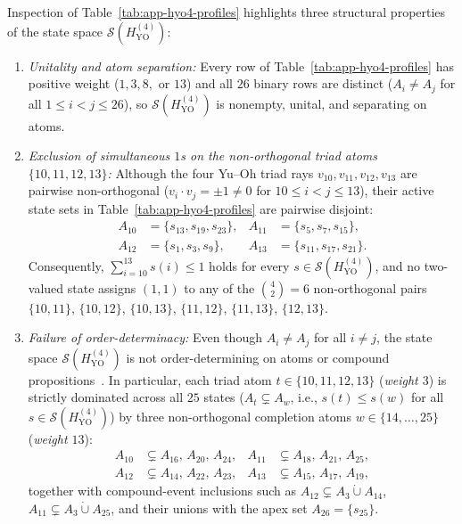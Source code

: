 \documentclass[
  aps,
  pra,
  reprint,
  superscriptaddress,
  amsmath,
  amssymb,
  nofootinbib,
  floatfix
]{revtex4-2}
\theoremstyle{definition}
\theoremstyle{remark}
\newcommand{\YO}{\mathrm{YO}}
\begin{document}
Inspection of Table~\ref{tab:app-hyo4-profiles} highlights three structural properties of the state space $\mathcal{S}(H_{\YO}^{(4)})$:
\begin{enumerate}
\item \emph{Unitality and atom separation:} Every row of Table~\ref{tab:app-hyo4-profiles} has positive weight ($1,3,8,$ or $13$) and all $26$ binary rows are distinct ($A_i\ne A_j$ for all $1\le i<j\le 26$), so $\mathcal{S}(H_{\YO}^{(4)})$ is nonempty, unital, and separating on atoms.
\item \emph{Exclusion of simultaneous $1$s on the non-orthogonal triad atoms $\{10,11,12,13\}$:} Although the four Yu--Oh triad rays $v_{10},v_{11},v_{12},v_{13}$ are pairwise non-orthogonal ($v_i\cdot v_j=\pm1\ne0$ for $10\le i<j\le 13$), their active state sets in Table~\ref{tab:app-hyo4-profiles} are pairwise disjoint:
\begin{equation}\label{eq:hyo4-triad-disjoint}
\begin{aligned}
A_{10}&=\{s_{13},s_{19},s_{23}\},&
A_{11}&=\{s_{5},s_{7},s_{15}\},\\
A_{12}&=\{s_{1},s_{3},s_{9}\},&
A_{13}&=\{s_{11},s_{17},s_{21}\}.
\end{aligned}
\end{equation}
Consequently, $\sum_{i=10}^{13}s(i)\le1$ holds for every $s\in\mathcal{S}(H_{\YO}^{(4)})$, and no two-valued state assigns $(1,1)$ to any of the $\binom{4}{2}=6$ non-orthogonal pairs $\{10,11\}$, $\{10,12\}$, $\{10,13\}$, $\{11,12\}$, $\{11,13\}$, $\{12,13\}$.
\item \emph{Failure of order-determinacy:} Even though $A_i\ne A_j$ for all $i\ne j$, the state space $\mathcal{S}(H_{\YO}^{(4)})$ is not order-determining on atoms or compound propositions~\cite{svozil-tkadlec}. In particular, each triad atom $t\in\{10,11,12,13\}$ (\emph{weight $3$}) is strictly dominated across all $25$ states ($A_t\subsetneq A_w$, i.e., $s(t)\le s(w)$ for all $s\in\mathcal{S}(H_{\YO}^{(4)})$) by three non-orthogonal completion atoms $w\in\{14,\ldots,25\}$ (\emph{weight $13$}):
\begin{equation}\label{eq:hyo4-inclusions}
\begin{aligned}
A_{10}&\subsetneq A_{16},\,A_{20},\,A_{24},&
A_{11}&\subsetneq A_{18},\,A_{21},\,A_{25},\\
A_{12}&\subsetneq A_{14},\,A_{22},\,A_{23},&
A_{13}&\subsetneq A_{15},\,A_{17},\,A_{19},
\end{aligned}
\end{equation}
together with compound-event inclusions such as $A_{12}\subsetneq A_3\mathbin{\dot\cup}A_{14}$, $A_{11}\subsetneq A_3\mathbin{\dot\cup}A_{25}$, and their unions with the apex set $A_{26}=\{s_{25}\}$.
\end{enumerate}
\end{document}
